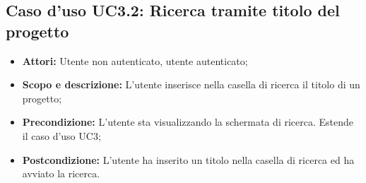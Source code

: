 \subsection{Caso d'uso UC3.2: Ricerca tramite titolo del progetto}
\begin{itemize}
	\item \textbf{Attori:} Utente non autenticato, utente autenticato;
	\item \textbf{Scopo e descrizione:} L'utente inserisce nella casella di ricerca il titolo di un progetto;
	\item \textbf{Precondizione:} L'utente sta visualizzando la schermata di ricerca. Estende il caso d'uso UC3;
	\item \textbf{Postcondizione:} L'utente ha inserito un titolo nella casella di ricerca ed ha avviato la ricerca.
\end{itemize}
